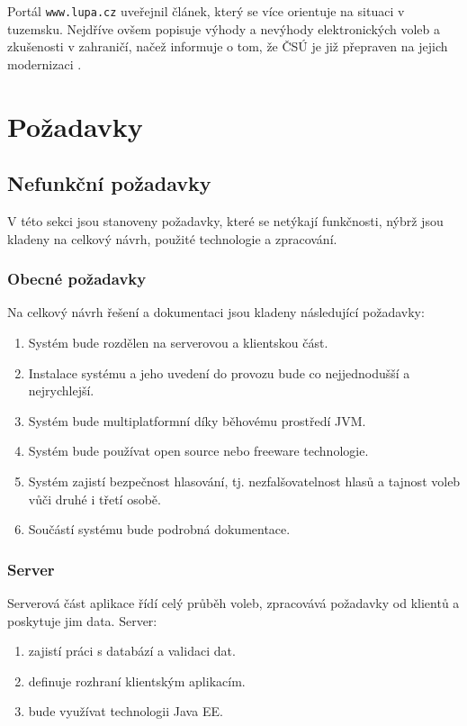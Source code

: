\documentclass[11pt,twoside,a4paper]{book}
\begin{document}
Portál \texttt{www.lupa.cz} \cite{www:lupa} uveřejnil článek, který se více orientuje na situaci v tuzemsku. Nejdříve ovšem popisuje výhody a nevýhody elektronických voleb a zkušenosti v zahraničí, načež informuje o tom, že ČSÚ je již přepraven na jejich modernizaci \cite{www:csu}. 

\section{Požadavky}

\subsection{Nefunkční požadavky}

V této sekci jsou stanoveny požadavky, které se netýkají funkčnosti, nýbrž jsou kladeny na celkový návrh, použité technologie a zpracování.

\subsubsection{Obecné požadavky} \label{sec:obecne_pozadavky}

Na celkový návrh řešení a dokumentaci jsou kladeny následující požadavky:

\begin{enumerate}
	\item Systém bude rozdělen na serverovou a klientskou část.
	\item Instalace systému a jeho uvedení do provozu bude co nejjednodušší a nejrychlejší.
	\item Systém bude multiplatformní díky běhovému prostředí JVM.
	\item Systém bude používat open source nebo freeware technologie.
	\item Systém zajistí bezpečnost hlasování, tj. nezfalšovatelnost hlasů a tajnost voleb vůči druhé i třetí osobě.
	\item Součástí systému bude podrobná dokumentace.
\end{enumerate}

\subsubsection{Server}

Serverová část aplikace řídí celý průběh voleb, zpracovává požadavky od klientů a poskytuje jim data. Server:

\begin{enumerate}
	\item zajistí práci s databází a validaci dat.
	\item definuje rozhraní klientským aplikacím.
	\item bude využívat technologii Java EE.
\end{enumerate}
\end{document}
